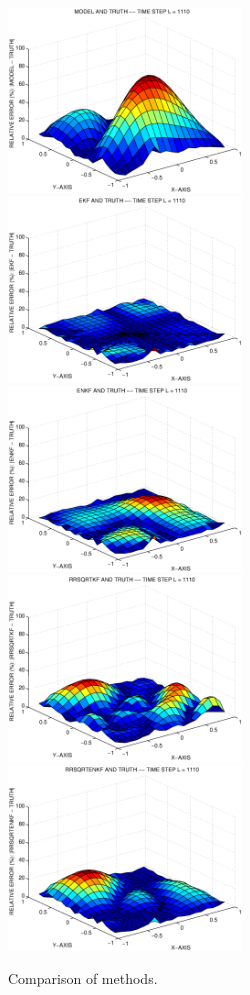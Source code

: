 \documentclass[12pt]{article}
\begin{document}
\begin{figure}[htb]
\begin{center}
\includegraphics[width=6.2cm]{example2d_model_truth.eps}
\\
\includegraphics[width=6.2cm]{example2d_ekf_truth.eps}
\includegraphics[width=6.2cm]{example2d_enkf_truth.eps}
\\
\includegraphics[width=6.2cm]{example2d_rrsqrtkf_truth.eps}
\includegraphics[width=6.2cm]{example2d_rrsqrtenkf_truth.eps}
\end{center}
\caption{Comparison of methods.}
\label{fig2d}
\end{figure}
\end{document}
